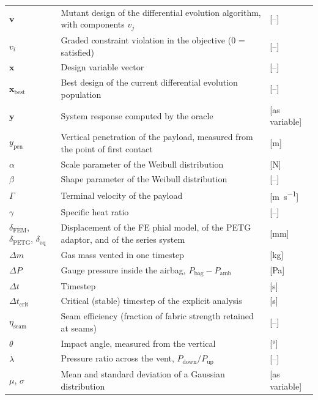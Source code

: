 {\begin{longtable}{L{0.16} L{0.64} L{0.20}}
$\mathbf{v}$ & Mutant design of the differential evolution algorithm, with components $v_j$ & [--] \\
$v_i$ & Graded constraint violation in the objective (0 = satisfied) & [--] \\
$\mathbf{x}$ & Design variable vector & [--] \\
$\mathbf{x}_\text{best}$ & Best design of the current differential evolution population & [--] \\
$\mathbf{y}$ & System response computed by the oracle & [as variable] \\
$y_\text{pen}$ & Vertical penetration of the payload, measured from the point of first contact & [\si{\metre}] \\
$\alpha$ & Scale parameter of the Weibull distribution & [\si{\newton}] \\
$\beta$ & Shape parameter of the Weibull distribution & [--] \\
$\Gamma$ & Terminal velocity of the payload & [\si{\metre\per\second}] \\
$\gamma$ & Specific heat ratio & [--] \\
$\delta_\text{FEM}$, $\delta_\text{PETG}$, $\delta_\text{eq}$ & Displacement of the FE phial model, of the PETG adaptor, and of the series system & [\si{\milli\metre}] \\
$\Delta m$ & Gas mass vented in one timestep & [\si{\kilogram}] \\
$\Delta P$ & Gauge pressure inside the airbag, $P_\text{bag} - P_\text{amb}$ & [\si{\pascal}] \\
$\Delta t$ & Timestep & [\si{\second}] \\
$\Delta t_\text{crit}$ & Critical (stable) timestep of the explicit analysis & [\si{\second}] \\
$\eta_\text{seam}$ & Seam efficiency (fraction of fabric strength retained at seams) & [--] \\
$\theta$ & Impact angle, measured from the vertical & [\si{\degree}] \\
$\lambda$ & Pressure ratio across the vent, $P_\text{down}/P_\text{up}$ & [--] \\
$\mu$, $\sigma$ & Mean and standard deviation of a Gaussian distribution & [as variable] \\

\end{longtable}}
